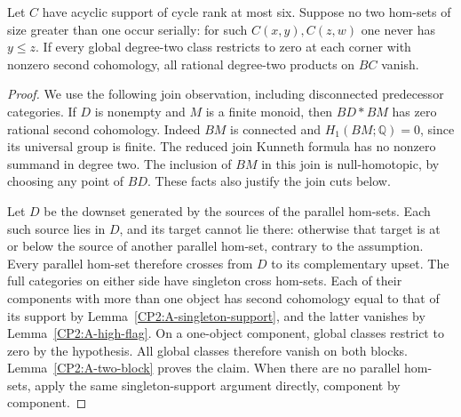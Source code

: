\begin{lemma}
\label{CP2:A-high-parallel-cut}
Let $C$ have acyclic support of cycle rank at most six.
Suppose no two hom-sets of size greater than one occur
serially: for such $C(x,y),C(z,w)$ one never has $y\leq z$.
If every global degree-two class restricts to zero at
each corner with nonzero second cohomology, all rational
degree-two products on $BC$ vanish.
\end{lemma}
\begin{proof}
We use the following join observation, including disconnected
predecessor categories.  If $D$ is nonempty and $M$ is a finite
monoid, then $BD*BM$ has zero rational second cohomology.
Indeed $BM$ is connected and $H_1(BM;\mathbb Q)=0$, since
its universal group is finite.  The reduced join Kunneth
formula has no nonzero summand in degree two.  The inclusion
of $BM$ in this join is null-homotopic, by choosing any point
of $BD$.  These facts also justify the join cuts below.

Let $D$ be the downset generated by the sources of the
parallel hom-sets.  Each such source lies in $D$, and
its target cannot lie there: otherwise that target is
at or below the source of another parallel hom-set,
contrary to the assumption.  Every parallel hom-set
therefore crosses from $D$ to its complementary upset.
The full categories on either side have singleton cross
hom-sets.  Each of their components with more than one
object has second cohomology equal to that of its support
by Lemma~\ref{CP2:A-singleton-support}, and the latter
vanishes by Lemma~\ref{CP2:A-high-flag}.  On a one-object
component, global classes restrict to zero by the
hypothesis.  All global classes therefore vanish on
both blocks.  Lemma~\ref{CP2:A-two-block} proves the claim.
When there are no parallel hom-sets, apply the same
singleton-support argument directly, component by component.
\end{proof}

